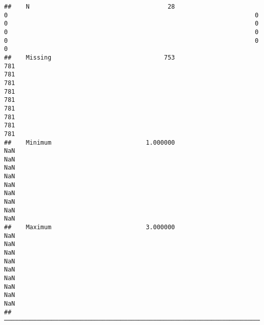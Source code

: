 \documentclass[
]{article}
\begin{document}
\begin{verbatim}
##    N                                      28                           0                                                                    0                                                                    0                                                                    0                                                                    0                                                                    0                                                                    0                                                                    0                                                                    0   
##    Missing                               753                         781                                                                  781                                                                  781                                                                  781                                                                  781                                                                  781                                                                  781                                                                  781                                                                  781   
##    Minimum                          1.000000                         NaN                                                                  NaN                                                                  NaN                                                                  NaN                                                                  NaN                                                                  NaN                                                                  NaN                                                                  NaN                                                                  NaN   
##    Maximum                          3.000000                         NaN                                                                  NaN                                                                  NaN                                                                  NaN                                                                  NaN                                                                  NaN                                                                  NaN                                                                  NaN                                                                  NaN   
##  ─────────────────────────────────────────────────────────────────────────────────────────────────────────────────────────────────────────────────────────────────────────────────────────────────────────────────────────────────────────────────────────────────────────────────────────────────────────────────────────────────────────────────────────────────────────────────────────────────────────────────────────────────────────────────────────────────────────────────────────────────────────────────────────────────────────────────────────────────────────────────────────────────────────────────────────────────────────────────
\end{verbatim}
\end{document}
